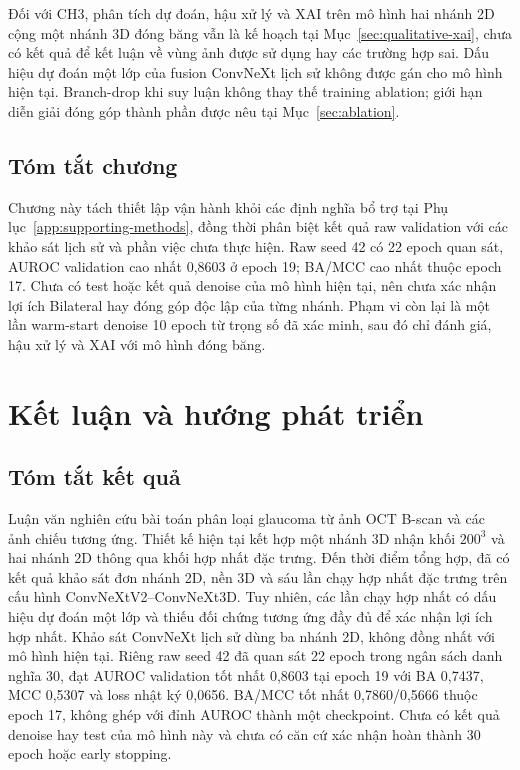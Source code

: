 \documentclass[14pt,a4paper,oneside]{extreport}
\begin{document}
Đối với CH3, phân tích dự đoán, hậu xử lý và XAI trên mô hình hai
nhánh 2D cộng một nhánh 3D đóng băng vẫn là kế hoạch tại
Mục~\ref{sec:qualitative-xai}, chưa có kết quả để kết luận về vùng
ảnh được sử dụng hay các trường hợp sai. Dấu hiệu dự đoán một lớp
của fusion ConvNeXt lịch sử không được gán cho mô hình hiện tại.
Branch-drop khi suy luận không thay thế training ablation; giới hạn
diễn giải đóng góp thành phần được nêu tại Mục~\ref{sec:ablation}.

\section{Tóm tắt chương}
Chương này tách thiết lập vận hành khỏi các định nghĩa bổ trợ tại
Phụ lục~\ref{app:supporting-methods}, đồng thời phân biệt kết quả
raw validation với các khảo sát lịch sử và phần việc chưa thực hiện.
Raw seed 42 có 22 epoch quan sát, AUROC validation cao nhất 0,8603
ở epoch 19; BA/MCC cao nhất thuộc epoch 17. Chưa có test hoặc kết
quả denoise của mô hình hiện tại, nên chưa xác nhận lợi ích Bilateral
hay đóng góp độc lập của từng nhánh. Phạm vi còn lại là một lần
warm-start denoise 10 epoch từ trọng số đã xác minh, sau đó chỉ đánh
giá, hậu xử lý và XAI với mô hình đóng băng.

\chapter{Kết luận và hướng phát triển}
\label{chap:conclusion}
\section{Tóm tắt kết quả}
Luận văn nghiên cứu bài toán phân loại glaucoma
từ ảnh OCT B-scan và các ảnh chiếu tương ứng.
Thiết kế hiện tại kết hợp một nhánh 3D nhận khối $200^3$ và hai nhánh 2D thông qua
khối hợp nhất đặc trưng. Đến thời điểm tổng hợp, đã có kết quả
khảo sát đơn nhánh 2D, nền 3D và sáu lần chạy hợp nhất đặc trưng trên cấu hình
ConvNeXtV2--ConvNeXt3D. Tuy nhiên, các lần chạy hợp nhất có dấu hiệu
dự đoán một lớp và thiếu đối chứng tương ứng đầy đủ để xác nhận
lợi ích hợp nhất. Khảo sát ConvNeXt lịch sử dùng ba nhánh 2D, không
đồng nhất với mô hình hiện tại. Riêng raw seed 42 đã quan sát 22 epoch
trong ngân sách danh nghĩa 30, đạt AUROC validation tốt nhất 0,8603
tại epoch 19 với BA 0,7437, MCC 0,5307 và loss nhật ký 0,0656.
BA/MCC tốt nhất 0,7860/0,5666 thuộc epoch 17, không ghép với đỉnh
AUROC thành một checkpoint. Chưa có kết quả denoise hay test của
mô hình này và chưa có căn cứ xác nhận hoàn thành 30 epoch hoặc early stopping.
\end{document}
